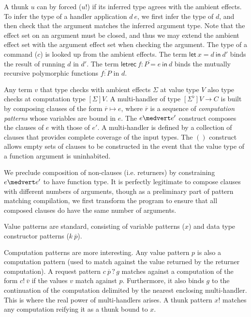 \documentclass[preprint]{sigplanconf}
\newcommand{\many}{\overline}
\newcommand{\sigs}{\Sigma}
\newcommand{\effbox}[1]{[#1]}
\newcommand{\key}[1]{\mathsf{#1}}
\newcommand{\handleSymbol}{\mathbin{?}}
\newcommand{\handle}[2]{{#1} \handleSymbol {#2}}
\newcommand{\force}[1]{{#1}!}
\begin{document}
A thunk $u$ can by forced ($u!$) if its inferred type agrees with the
ambient effects. To infer the type of a handler application $d~e$, we
first infer the type of $d$, and then check that the argument matches
the inferred argument type. Note that the effect set on an argument
must be closed, and thus we may extend the ambient effect set with the
argument effect set when checking the argument.
%
The type of a command ($c$) is looked up from the ambient effects.
%
The term $\key{let}~x=d~\key{in}~d'$ binds the result of running $d$
in $d'$.
%
The term $\key{letrec}~\many{f : P = e}~\key{in}~d$ binds the mutually
recursive polymorphic functions $\many{f:P}$ in $d$.

Any term $v$ that type checks with ambient effects $\sigs$ at value
type $V$ also type checks at computation type $\effbox{\sigs}V$.
%
A multi-handler of type $\many{\effbox{\sigs'}V} \to C$ is built by
composing clauses of the form $\many{r} \mapsto e$, where $\many{r}$
is a sequence of \emph{computation patterns} whose variables are bound
in $e$.
%
The $e \medvert e'$ construct composes the clauses of $e$ with those
of $e'$. A multi-handler is defined by a collection of clauses that
provides complete coverage of the input types.
%
The $()$ construct allows empty sets of clauses to be constructed in
the event that the value type of a function argument is uninhabited.

We preclude composition of non-clauses (i.e. returners) by
constraining $e \medvert e'$ to have function type.
%
It is perfectly legitimate to compose clauses with different numbers
of arguments, though as a preliminary part of pattern matching
compilation, we first transform the program to ensure that all
composed clauses do have the same number of arguments.

Value patterns are standard, consisting of variable patterns ($x$) and
data type constructor patterns ($k~\many{p}$).

Computation patterns are more interesting. Any value pattern $p$ is
also a computation pattern (used to match against the value returned
by the returner computation).
%
A request pattern $\handle{c~\many{p}}{g}$ matches against a
computation of the form $\force{c}~\many{v}$ if the values $v$ match
against $p$. Furthermore, it also binds $g$ to the continuation of the
computation delimited by the nearest enclosing multi-handler. This is
where the real power of multi-handlers arises. A thunk pattern
$\force{x}$ matches any computation reifying it as a thunk bound to
$x$.
\end{document}

